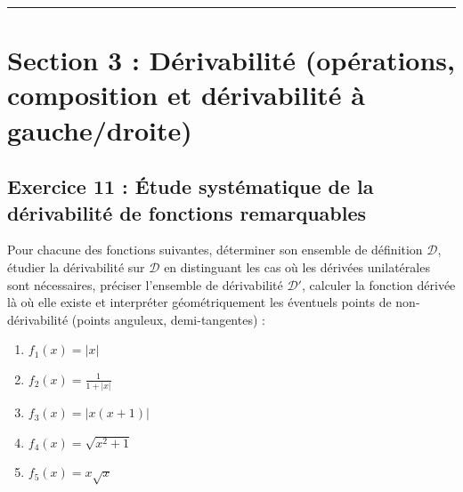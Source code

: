 \documentclass[11pt,a4paper]{article}
\begin{document}
\vspace{1cm}
\hrule
\vspace{1cm}
\section{Section 3 : Dérivabilité (opérations, composition et dérivabilité à gauche/droite)}

\subsection*{Exercice 11 : Étude systématique de la dérivabilité de fonctions remarquables}

Pour chacune des fonctions suivantes, déterminer son ensemble de définition $\mathcal{D}$, étudier la dérivabilité sur $\mathcal{D}$ en distinguant les cas où les dérivées unilatérales sont nécessaires, préciser l'ensemble de dérivabilité $\mathcal{D}'$, calculer la fonction dérivée là où elle existe et interpréter géométriquement les éventuels points de non-dérivabilité (points anguleux, demi-tangentes) :
\begin{enumerate}[label=\textbf{\arabic*.}]
    \item $f_1(x) = |x|$
    \item $f_2(x) = \frac{1}{1 + |x|}$
    \item $f_3(x) = |x(x+1)|$
    \item $f_4(x) = \sqrt{x^2+1}$
    \item $f_5(x) = x\sqrt{x}$
\end{enumerate}
\end{document}
